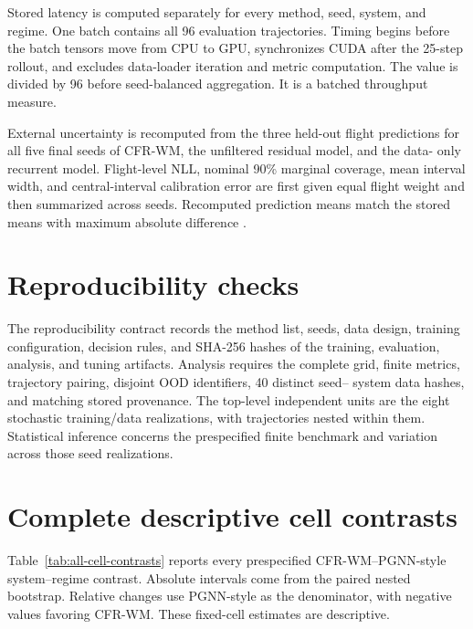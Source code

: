 Stored latency is computed separately for every method, seed, system, and
regime. One batch contains all 96 evaluation trajectories. Timing begins before
the batch tensors move from CPU to GPU, synchronizes CUDA after the 25-step
rollout, and excludes data-loader iteration and metric computation. The value
is divided by 96 before seed-balanced aggregation. It is a batched throughput
measure.

External uncertainty is recomputed from the three held-out flight predictions
for all five final seeds of CFR-WM, the unfiltered residual model, and the data-
only recurrent model. Flight-level NLL, nominal 90\% marginal coverage, mean
interval width, and central-interval calibration error are first given equal
flight weight and then summarized across seeds. Recomputed prediction means
match the stored means with maximum absolute difference
\ExternalMeanReconstructionDifference{}.

\section{Reproducibility checks}

The reproducibility contract records the method list, seeds, data design,
training configuration, decision rules, and SHA-256 hashes of the training,
evaluation, analysis, and tuning artifacts. Analysis requires the complete grid,
finite metrics, trajectory pairing, disjoint OOD identifiers, 40 distinct seed--
system data hashes, and matching stored provenance. The top-level independent
units are the eight stochastic training/data realizations, with trajectories
nested within them. Statistical inference concerns the prespecified finite
benchmark and variation across those seed realizations.

\section{Complete descriptive cell contrasts}

Table~\ref{tab:all-cell-contrasts} reports every prespecified CFR-WM--PGNN-style
system--regime contrast. Absolute intervals come from the paired nested
bootstrap. Relative changes use PGNN-style as the denominator, with negative values
favoring CFR-WM. These fixed-cell estimates are descriptive.

\begin{table}[ht]
\centering
\small
\caption{All 15 descriptive CFR-WM versus PGNN-style NRMSE-25 contrasts.}
\label{tab:all-cell-contrasts}
\resizebox{\textwidth}{!}{}
\end{table}
